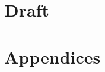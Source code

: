 \documentclass[letter,10pt,openany]{article}
\begin{document}

\maketitle
\thispagestyle{empty}
\tableofcontents

\chapter{Draft}





\chapter{Appendices}
\appendix



\end{document}
